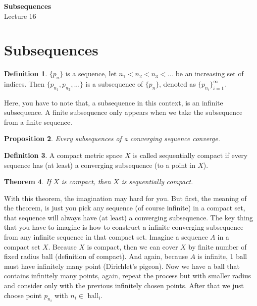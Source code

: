 \documentclass[12pt]{article}
\theoremstyle{definition}
\newtheorem{definition}{Definition}[section]
\theoremstyle{plain}
\newtheorem{theorem}[definition]{Theorem}
\newtheorem{proposition}[definition]{Proposition}
\begin{document}

\begin{center}
    {\Large \textbf{Subsequences}}\\[0.5em]
    {\large Lecture 16}
\end{center}

\tableofcontents

\newpage

\section{Subsequences}
\begin{definition}
$\{p_n\}$ is a sequence, let $n_1<n_2<n_3<...$ be an increasing set of indices. Then $\{p_{n_1}, p_{n_2},...\}$ is a subsequence of $\{p_n\}$, denoted as $\{p_{n_i}\}^{\infty}_{i=1}$.
\end{definition}

\begin{note}
Here, you have to note that, a subsequence in this context, is an infinite subsequence. A finite subsequence only appears when we take the subsequence from a finite sequence.
\end{note}

\begin{proposition}
Every subsequences of a converging sequence converge.
\end{proposition}

\begin{definition}
A compact metric space $X$ is called sequentially compact if every sequence has (at least) a converging subsequence (to a point in $X$). 
\end{definition}

\begin{theorem}
If $X$ is compact, then $X$ is sequentially compact.
\end{theorem}

\begin{note}
With this theorem, the imagination may hard for you. But first, the meaning of the theorem, is just you pick any sequence (of course infinite) in a compact set, that sequence will always have (at least) a converging subsequence. The key thing that you have to imagine is how to construct a infinite converging subsequence from any infinite sequence in that compact set. Imagine a sequence $A$ in a compact set $X$. Because $X$ is compact, then we can cover $X$ by finite number of fixed radius ball (definition of compact). And again, because $A$ is infinite, 1 ball must have infinitely many point (Dirichlet's pigeon). Now we have a ball that contains infinitely many points, again, repeat the process but with smaller radius and consider only with the previous infinitely chosen points. After that we just choose point $p_{n_i}$ with $n_i \in \text{ ball}_i$.
\end{note}
\end{document}
